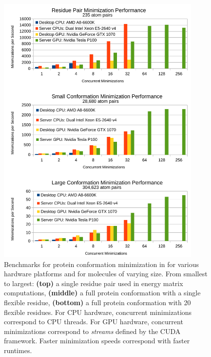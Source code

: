 \begin{figure}\label{fig:gpu}
\center
\includegraphics[width=4in]{figures/gpu.pdf}

\caption{Benchmarks for protein conformation minimization in  for various hardware platforms and for molecules of varying size. From smallest to largest: {\bf (top)} a single residue pair used in energy matrix computations, {\bf (middle)} a full protein conformation with a single flexible residue, {\bf (bottom)} a full protein conformation with 20 flexible residues. For CPU hardware, concurrent minimizations correspond to CPU threads. For GPU hardware, concurrent minimizations correspond to {\it streams} defined by the CUDA framework. Faster minimization speeds correspond with faster \osprey runtimes.}
\end{figure}
